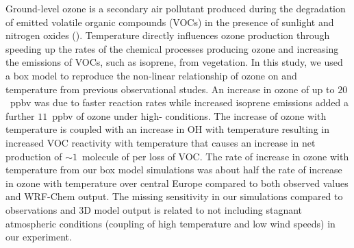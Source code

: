 Ground-level ozone is a secondary air pollutant produced during the degradation of emitted volatile organic compounds (VOCs) in the presence of sunlight and nitrogen oxides (). 
Temperature directly influences ozone production through speeding up the rates of the chemical processes producing ozone and increasing the emissions of VOCs, such as isoprene, from vegetation.
In this study, we used a box model to reproduce the non-linear relationship of ozone on  and temperature from previous observational studes.
An increase in ozone of up to $20$~ppbv was due to faster reaction rates while increased isoprene emissions added a further $11$~ppbv of ozone under high- conditions.
The increase of ozone with temperature is coupled with an increase in OH with temperature resulting in increased VOC reactivity with temperature that causes an increase in net  production of $\sim1$~molecule of  per loss of VOC.
The rate of increase in ozone with temperature from our box model simulations was about half the rate of increase in ozone with temperature over central Europe compared to both observed values and WRF-Chem output.
The missing sensitivity in our simulations compared to observations and 3D model output is related to not including stagnant atmospheric conditions (coupling of high temperature and low wind speeds) in our experiment.
